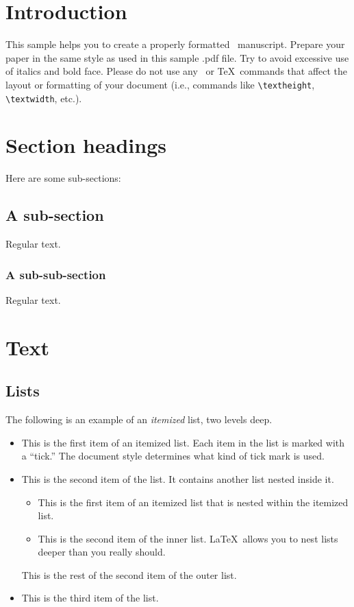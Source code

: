 \documentclass[ps]{imsart}
\theoremstyle{plain}
\theoremstyle{definition}
\theoremstyle{remark}
\begin{document}
\section{Introduction}

This sample helps you to create a properly formatted \LaTeXe\ manuscript.
Prepare your paper in the same style as used in this sample .pdf file.
Try to avoid excessive use of italics and bold face.
Please do not use any \LaTeXe\ or \TeX\ commands that affect the layout
or formatting of your document (i.e., commands like \verb|\textheight|,
\verb|\textwidth|, etc.).

\section{Section headings}
Here are some sub-sections:
\subsection{A sub-section}
Regular text.
\subsubsection{A sub-sub-section}
Regular text.

\section{Text}
\subsection{Lists}

The following is an example of an \emph{itemized} list,
two levels deep.
\begin{itemize}
\item
This is the first item of an itemized list.  Each item
in the list is marked with a ``tick.''  The document
style determines what kind of tick mark is used.
\item
This is the second item of the list.  It contains another
list nested inside it.
\begin{itemize}
\item This is the first item of an itemized list that
is nested within the itemized list.
\item This is the second item of the inner list.  \LaTeX\
allows you to nest lists deeper than you really should.
\end{itemize}
This is the rest of the second item of the outer list.
\item
This is the third item of the list.
\end{itemize}
\end{document}
